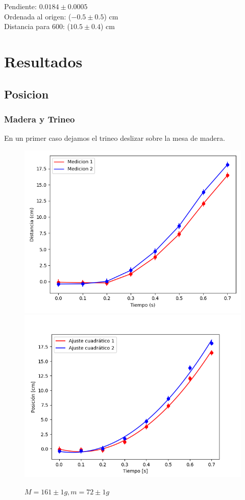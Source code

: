 \documentclass[12pt,a4]{article}
\begin{document}
Pendiente: $0.0184 \pm 0.0005$ \\

Ordenada al origen: ($-0.5 \pm 0.5$) cm\\

Distancia para 600: ($10.5 \pm 0.4$) cm \\

\newpage

\section{Resultados}

\subsection{Posicion}

\subsubsection*{Madera y Trineo}

En un primer caso dejamos el trineo deslizar sobre la mesa de madera. \\

\begin{figure}[H]
    \centering
    \includegraphics[width=0.4\linewidth]{TiempoVsDistanciaPisoMadera2PB_O.png}
    \includegraphics[width=0.44\linewidth]{ajuste2_PisoMadera2PB_O.png}
    \caption{$M = 161 \pm 1 g, m = 72 \pm 1 g$}
    \label{fig:2PB_O piso trineo}

\end{figure}
\end{document}
